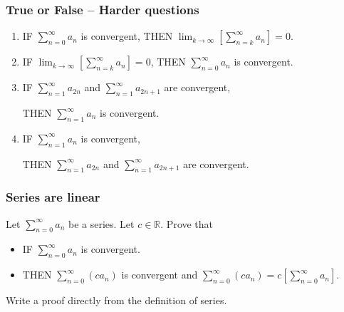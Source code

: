 \documentclass[14pt]{beamer}
\begin{document}
\begin{frame}[t]
	\fontsize{12}{12}\selectfont
	\frametitle{True or False -- Harder questions}
	\vspace{-.2cm}
	\begin{enumerate}
		\item IF $\displaystyle \sum_{n=0}^{\infty}a_{n}$ is convergent, \quad THEN
			$\displaystyle \lim_{k \to \infty}\left[ \sum_{n=k}^{\infty}a_{n}\right] =
			0$.
			\vspace{.2cm}

		\item IF $\displaystyle \lim_{k \to \infty}\left[ \sum_{n=k}^{\infty}a_{n}\right
			] = 0$, \quad THEN $\displaystyle \sum_{n=0}^{\infty}a_{n}$ is convergent.
			\vspace{.2cm}

		\item IF $\displaystyle \sum_{n=1}^{\infty}a_{2n}$ and $\displaystyle \sum_{n=1}
			^{\infty}a_{2n+1}$ are convergent,

			THEN $\displaystyle \sum_{n=1}^{\infty}a_{n}$ is convergent.
			\vspace{.2cm}

		\item IF $\displaystyle \sum_{n=1}^{\infty}a_{n}$ is convergent,

			THEN $\displaystyle \sum_{n=1}^{\infty}a_{2n}$ and $\displaystyle \sum_{n=1}
			^{\infty}a_{2n+1}$ are convergent.
	\end{enumerate}
\end{frame}

\begin{frame}[t]
	\fontsize{13}{13}\selectfont
	\frametitle{Series are linear}

	Let $\displaystyle \sum_{n=0}^{\infty}a_{n}$ be a series. Let
	$c \in \mathbb{R}$. Prove that
	\begin{itemize}
		\item IF $\displaystyle \sum_{n=0}^{\infty}a_{n}$ is convergent.

		\item THEN $\displaystyle \sum_{n=0}^{\infty}( ca_{n})$ is convergent and $\displaystyle
			\sum_{n=0}^{\infty}( c a_{n}) = c \left[ \sum_{n=0}^{\infty}a_{n}\right].$
	\end{itemize}
	\vspace{.5cm}

	Write a proof directly from the definition of series.
\end{frame}
\end{document}
